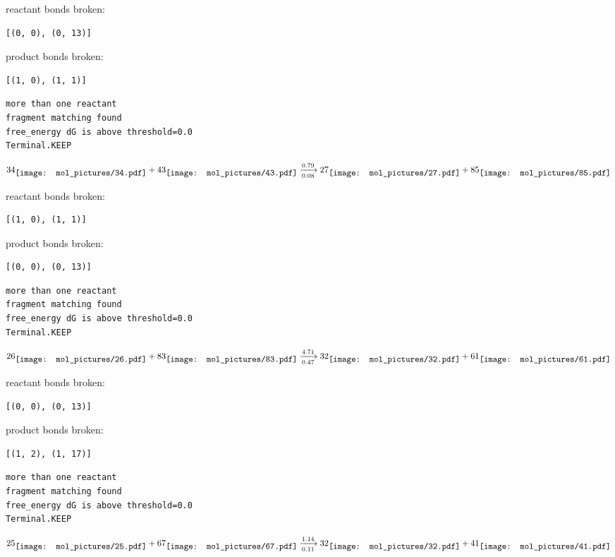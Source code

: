 \documentclass{article}
\begin{document}
reactant bonds broken:\begin{verbatim}
[(0, 0), (0, 13)]
\end{verbatim}
product bonds broken:\begin{verbatim}
[(1, 0), (1, 1)]
\end{verbatim}




\vspace{1cm}
\begin{verbatim}
more than one reactant
fragment matching found
free_energy dG is above threshold=0.0
Terminal.KEEP
\end{verbatim}
$$
34
\raisebox{-.5\height}{\texttt{[image: mol\_pictures/34.pdf]}}
+
43
\raisebox{-.5\height}{\texttt{[image: mol\_pictures/43.pdf]}}
\xrightarrow[0.08]{0.79}
27
\raisebox{-.5\height}{\texttt{[image: mol\_pictures/27.pdf]}}
+
85
\raisebox{-.5\height}{\texttt{[image: mol\_pictures/85.pdf]}}
$$


reactant bonds broken:\begin{verbatim}
[(1, 0), (1, 1)]
\end{verbatim}
product bonds broken:\begin{verbatim}
[(0, 0), (0, 13)]
\end{verbatim}




\vspace{1cm}
\begin{verbatim}
more than one reactant
fragment matching found
free_energy dG is above threshold=0.0
Terminal.KEEP
\end{verbatim}
$$
26
\raisebox{-.5\height}{\texttt{[image: mol\_pictures/26.pdf]}}
+
83
\raisebox{-.5\height}{\texttt{[image: mol\_pictures/83.pdf]}}
\xrightarrow[0.47]{4.71}
32
\raisebox{-.5\height}{\texttt{[image: mol\_pictures/32.pdf]}}
+
61
\raisebox{-.5\height}{\texttt{[image: mol\_pictures/61.pdf]}}
$$


reactant bonds broken:\begin{verbatim}
[(0, 0), (0, 13)]
\end{verbatim}
product bonds broken:\begin{verbatim}
[(1, 2), (1, 17)]
\end{verbatim}




\vspace{1cm}
\begin{verbatim}
more than one reactant
fragment matching found
free_energy dG is above threshold=0.0
Terminal.KEEP
\end{verbatim}
$$
25
\raisebox{-.5\height}{\texttt{[image: mol\_pictures/25.pdf]}}
+
67
\raisebox{-.5\height}{\texttt{[image: mol\_pictures/67.pdf]}}
\xrightarrow[0.11]{1.14}
32
\raisebox{-.5\height}{\texttt{[image: mol\_pictures/32.pdf]}}
+
41
\raisebox{-.5\height}{\texttt{[image: mol\_pictures/41.pdf]}}
$$
\end{document}
